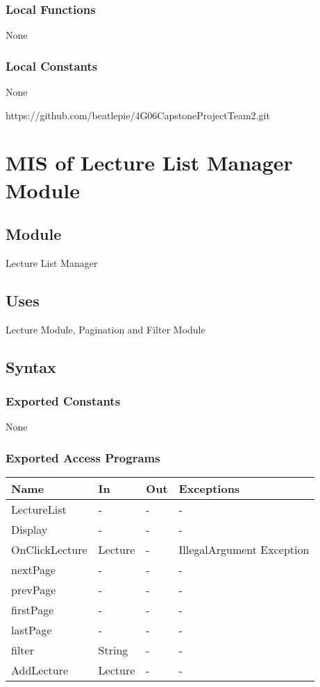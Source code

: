 \documentclass[12pt, titlepage]{article}
\begin{document}
\subsubsection{Local Functions}

None

\subsubsection{Local Constants}

None

\newpage

https://github.com/beatlepie/4G06CapstoneProjectTeam2.git

\section{MIS of Lecture List Manager Module} \label{mLL}

\subsection{Module}

Lecture List Manager

\subsection{Uses}

Lecture Module, Pagination and Filter Module

\subsection{Syntax}

\subsubsection{Exported Constants}
None

\subsubsection{Exported Access Programs}
\begin{center}
\begin{tabular}{p{4cm} p{2cm} p{4cm} p{4cm}}
\hline
\textbf{Name} & \textbf{In} & \textbf{Out} & \textbf{Exceptions} \\
\hline
LectureList & - & - & -\\
Display & - & - & - \\
OnClickLecture & Lecture & - & IllegalArgument Exception\\ 
nextPage & - & - &  -\\
prevPage & - & - &  -\\
firstPage & - & - &  -\\
lastPage & - & - &  -\\
filter & String & - & -\\
AddLecture & Lecture & - & - \\
\hline
\end{tabular}
\end{center}
\end{document}
